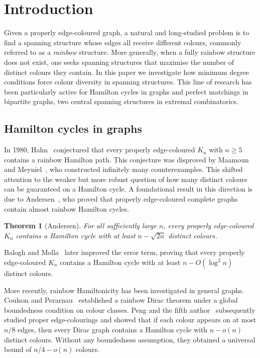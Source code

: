 \documentclass[11pt,reqno]{amsart}
\newtheorem{theorem}{Theorem}[section]
\theoremstyle{definition}
\theoremstyle{remark}
\renewcommand\ge{\geqslant}
\begin{document}
\section{Introduction}
Given a properly edge-coloured graph, a natural and long-studied problem is to find a spanning structure whose edges all receive different colours, commonly referred to as a \emph{rainbow} structure. More generally, when a fully rainbow structure does not exist, one seeks spanning structures that maximise the number of distinct colours they contain. In this paper we investigate how minimum degree conditions force colour diversity in spanning structures. This line of research has been particularly active for Hamilton cycles in graphs and perfect matchings in bipartite graphs, two central spanning structures in extremal combinatorics.

\subsection{Hamilton cycles in graphs}

In 1980, Hahn~\cite{Hahn} conjectured that every properly edge-coloured
$K_n$ with $n\ge5$ contains a rainbow Hamilton path.
This conjecture was disproved by Maamoun and Meyniel~\cite{MM}, who
constructed infinitely many counterexamples.
This shifted attention to the weaker but more robust question of how many
distinct colours can be guaranteed on a Hamilton cycle. A foundational result in this direction is due to Andersen~\cite{A}, who proved that properly edge-coloured complete graphs contain
almost rainbow Hamilton cycles.

\begin{theorem}[Andersen]
For all sufficiently large $n$, every properly edge-coloured $K_n$
contains a Hamilton cycle with at least $n-\sqrt{2n}$ distinct colours.
\end{theorem}

Balogh and Molla~\cite{BM} later improved the error term, proving that every properly edge-coloured $K_n$ contains a Hamilton cycle with at least $n - O(\log^2 n)$ distinct colours.

More recently, rainbow Hamiltonicity has been investigated in general
graphs.
Coulson and Perarnau~\cite{CP} established a rainbow Dirac theorem under
a global boundedness condition on colour classes.
Peng and the fifth author~\cite{PY} subsequently studied proper
edge-colourings and showed that if each colour appears on at most $n/8$
edges, then every Dirac graph contains a Hamilton cycle with $n-o(n)$
distinct colours.
Without any boundedness assumption, they obtained a universal bound of
$n/4-o(n)$ colours.
\end{document}
